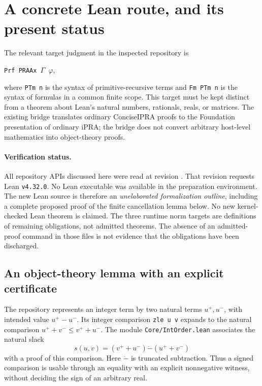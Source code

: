 \section{A concrete Lean route, and its present status}
\label{sec:lean-route}

The relevant target judgment in the inspected repository is
\begin{center}
\texttt{Prf PRAAx \(\Gamma\) \(\varphi\)},
\end{center}
where \texttt{PTm n} is the syntax of primitive-recursive terms and
\texttt{Fm PTm n} is the syntax of formulas in a common finite scope.
This target must be kept distinct from a theorem about Lean's natural
numbers, rationals, reals, or matrices.  The existing bridge translates
ordinary ConciseIPRA proofs to the Foundation presentation of ordinary
iPRA; the bridge does not convert arbitrary host-level mathematics into
object-theory proofs.

\paragraph{Verification status.}
All repository APIs discussed here were read at revision
.
That revision requests Lean \texttt{v4.32.0}.
No Lean executable was available in the preparation environment.
The new Lean source is therefore an \emph{unelaborated formalization
outline}, including a complete proposed proof of the finite cancellation
lemma below.  No new kernel-checked Lean theorem is claimed.
The three runtime norm targets are definitions of remaining obligations,
not admitted theorems.  The absence of an admitted-proof command in those
files is not evidence that the obligations have been discharged.

\subsection{An object-theory lemma with an explicit certificate}

The repository represents an integer term by two natural terms
\(u^+,u^-\), with intended value \(u^+-u^-\).
Its integer comparison \texttt{zle u v} expands to the natural comparison
\(u^++v^-\leq v^++u^-\).
The module \texttt{Core/IntOrder.lean} associates the natural slack
\[
 s(u,v)=(v^++u^-)\mathbin{\dot-}(u^++v^-)
\]
with a proof of this comparison.  Here \(\dot-\) is truncated subtraction.
Thus a signed comparison is usable through an equality with an explicit
nonnegative witness, without deciding the sign of an arbitrary real.


